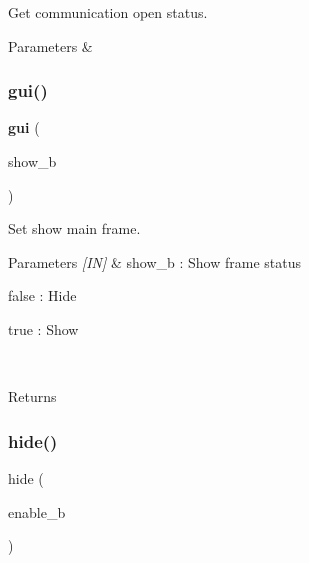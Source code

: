 Get communication open status. 


\begin{DoxyCode}{0}
\end{DoxyCode}



\begin{DoxyParams}{Parameters}
{\em } & \\
\hline
\end{DoxyParams}
\mbox{\label{classmain__frame_aebbde0b9de677f5038f5e61c3748e4c6}} 
\subsubsection{gui()}
{\footnotesize\ttfamily \textbf{ gui} (\begin{DoxyParamCaption}\item[{show\+\_\+b}]{ }\end{DoxyParamCaption})}



Set show main frame. 


\begin{DoxyCode}{0}
\end{DoxyCode}



\begin{DoxyParams}{Parameters}
{\em \mbox{[}\+I\+N\mbox{]}} & show\+\_\+b \+: Show frame status \begin{DoxyItemize}
\item false \+: Hide \item true \+: Show \end{DoxyItemize}
\\
\hline
\end{DoxyParams}
\begin{DoxyReturn}{Returns}

\end{DoxyReturn}
\mbox{\label{classmain__frame_a9daa589d2e74c269cc78bccaca50bf40}} 
\subsubsection{hide()}
{\footnotesize\ttfamily hide (\begin{DoxyParamCaption}\item[{enable\+\_\+b}]{ }\end{DoxyParamCaption})}



